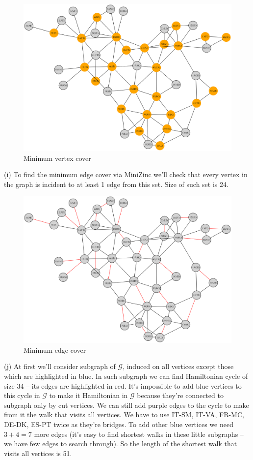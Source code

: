 \documentclass{article}
\begin{document}
	\begin{figure}[h]
		\centering
		\includegraphics[width=1\textwidth]{v_cover.png}
		\caption{Minimum vertex cover}
	\end{figure}\newpage
	(i) To find the minimum edge cover via MiniZinc we'll check that every vertex in the graph is incident to at least 1 edge from this set. Size of such set is 24.
	\begin{figure}[h]
		\centering
		\includegraphics[width=1\textwidth]{ecover.png}
		\caption{Minimum edge cover}
	\end{figure}\newpage
	(j) At first we'll consider subgraph of $\mathcal{G}$, induced on all vertices except those which are highlighted in blue. In such subgraph we can find Hamiltonian cycle of size 34 -- its edges are highlighted in red. It's impossible to add blue vertices to this cycle in $\mathcal{G}$ to make it Hamiltonian in $\mathcal{G}$ because they're connected to subgraph only by cut vertices. We can still add purple edges to the cycle to make from it the walk that visits all vertices. We have to use IT-SM, IT-VA, FR-MC, DE-DK, ES-PT twice as they're bridges. To add other blue vertices we need $3 + 4 = 7$ more edges (it's easy to find shortest walks in these little subgraphs -- we have few edges to search through). So the length of the shortest walk that visits all vertices is 51.
\end{document}

